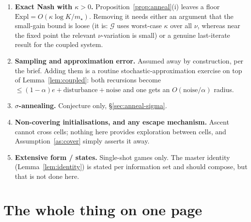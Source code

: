 \documentclass[11pt,a4paper]{article}
\theoremstyle{plain}
\theoremstyle{definition}
\theoremstyle{remark}
\newcommand{\Expl}{\mathrm{Expl}}
\begin{document}
\begin{enumerate}[leftmargin=*]
\item \textbf{Exact Nash with $\kappa>0$.} Proposition~\ref{prop:anneal}(i) leaves a
floor $\Expl=O(\kappa\log K/m_\star)$. Removing it needs either an argument that
the small-gain bound is loose (it is: $\mathcal G$ uses worst-case $\kappa$ over all
$\nu$, whereas near the fixed point the relevant $\nu$-variation is small) or a
genuine last-iterate result for the coupled system.
\item \textbf{Sampling and approximation error.} Assumed away by construction, per
the brief. Adding them is a routine stochastic-approximation exercise on top of
Lemma~\ref{lem:coupled}: both recursions become $\le(1-\alpha)e+\text{disturbance}+\text{noise}$
and one gets an $O(\text{noise}/\alpha)$ radius.
\item \textbf{$\sigma$-annealing.} Conjecture only, \S\ref{sec:anneal-sigma}.
\item \textbf{Non-covering initialisations, and any escape mechanism.} Ascent cannot
cross cells; nothing here provides exploration between cells, and
Assumption~\ref{as:cover} simply asserts it away.
\item \textbf{Extensive form / states.} Single-shot games only. The master identity
(Lemma~\ref{lem:identity}) is stated per information set and should compose, but
that is not done here.
\end{enumerate}

\section{The whole thing on one page}
\end{document}
